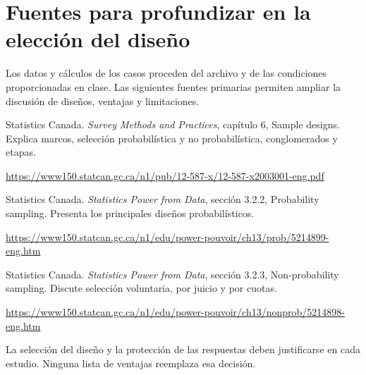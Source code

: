 \documentclass[11pt,letterpaper]{article}
\begin{document}
\section{Fuentes para profundizar en la elección del diseño}
Los datos y cálculos de los casos proceden del archivo y de las condiciones proporcionadas en clase. Las siguientes fuentes primarias permiten ampliar la discusión de diseños, ventajas y limitaciones.

Statistics Canada. \textit{Survey Methods and Practices}, capítulo 6, Sample designs. Explica marcos, selección probabilística y no probabilística, conglomerados y etapas.\par
\url{https://www150.statcan.gc.ca/n1/pub/12-587-x/12-587-x2003001-eng.pdf}

Statistics Canada. \textit{Statistics Power from Data}, sección 3.2.2, Probability sampling. Presenta los principales diseños probabilísticos.\par
\url{https://www150.statcan.gc.ca/n1/edu/power-pouvoir/ch13/prob/5214899-eng.htm}

Statistics Canada. \textit{Statistics Power from Data}, sección 3.2.3, Non-probability sampling. Discute selección voluntaria, por juicio y por cuotas.\par
\url{https://www150.statcan.gc.ca/n1/edu/power-pouvoir/ch13/nonprob/5214898-eng.htm}

La selección del diseño y la protección de las respuestas deben justificarse en cada estudio. Ninguna lista de ventajas reemplaza esa decisión.
\end{document}
